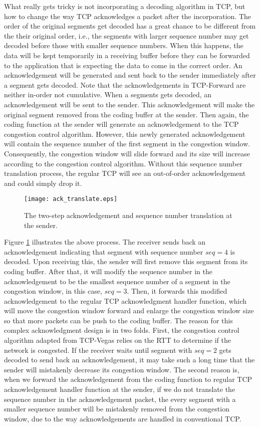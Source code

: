\documentclass[10pt, conference, final, letterpaper]{IEEEtran}
\theoremstyle{definition}
\begin{document}
What really gets tricky is not incorporating a decoding algorithm in TCP, but how to change the way TCP acknowledges a packet after the incorporation. The order of the original segments get decoded has a great chance to be different from the their original order, i.e., the segments with larger sequence number may get decoded before those with smaller sequence numbers. When this happens, the data will be kept temporarily in a receiving buffer before they can be forwarded to the application that is expecting the data to come in the correct order. An acknowledgement will be generated and sent back to the sender immediately after a segment gets decoded. Note that the acknowledgements in TCP-Forward are neither in-order not cumulative. When a segments gets decoded, an acknowledgement will be sent to the sender. This acknowledgement will make the original segment removed from the coding buffer at the sender. Then again, the coding function at the sender will generate an acknowledgement to the TCP congestion control algorithm. However, this newly generated acknowledgement will contain the sequence number of the first segment in the congestion window. Consequently, the congestion window will slide forward and its size will increase according to the congestion control algorithm. Without this sequence number translation process, the regular TCP will see an out-of-order acknowledgement and could simply drop it.

\begin{figure}[htb]
	\begin{center}
		\texttt{[image: ack\_translate.eps]}
	\end{center}
	\caption{The two-step acknowledgement and sequence number translation at the sender.}
	\label{fig:acks}
\end{figure}

Figure \ref{fig:acks} illustrates the above process. The receiver sends back an acknowledgement indicating that segment with sequence number $seq = 4$ is decoded. Upon receiving this, the sender will first remove this segment from its coding buffer. After that, it will modify the sequence number in the acknowledgement to be the smallest sequence number of a segment in the congestion window, in this case, $seq = 3$. Then, it forwards this modified acknowledgement to the regular TCP acknowledgment handler function, which will move the congestion window forward and enlarge the congestion window size so that more packets can be push to the coding buffer. The reason for this complex acknowledgment design is in two folds. First, the congestion control algorithm adapted from TCP-Vegas relies on the RTT to determine if the network is congested. If the receiver waits until segment with $seq = 2$ gets decoded to send back an acknowledgement, it may take such a long time that the sender will mistakenly decrease its congestion window. The second reason is, when we forward the acknowledgement from the coding function to regular TCP acknowledgement handler function at the sender, if we do not translate the sequence number in the acknowledgement packet, the every segment with a smaller sequence number will be mistakenly removed from the congestion window, due to the way acknowledgements are handled in conventional TCP.
\end{document}
